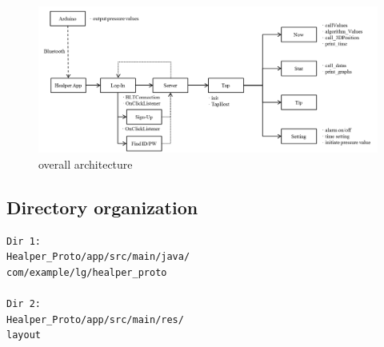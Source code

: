 \documentclass[conference]{IEEEtran}
\begin{document}
\begin{figure}[H]
\begin{center}
    \includegraphics[scale=0.24]{img_16}
    \caption{overall architecture} 
\end{center}
\end{figure}

\subsection{Directory organization}

\begin{verbatim}
Dir 1: 
Healper_Proto/app/src/main/java/
com/example/lg/healper_proto

Dir 2:
Healper_Proto/app/src/main/res/
layout
\end{verbatim}
\end{document}
